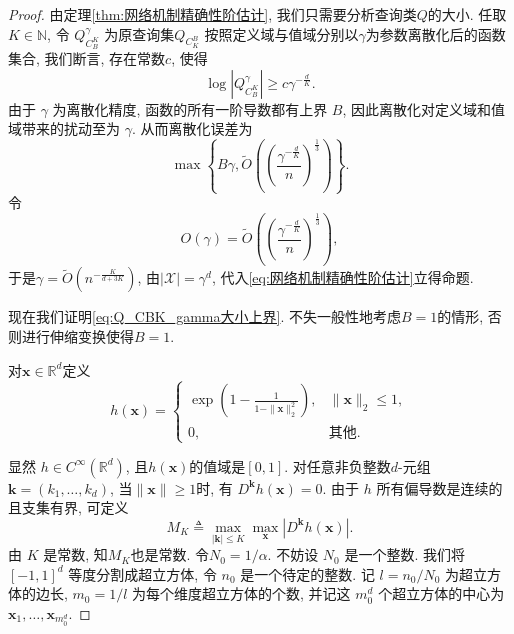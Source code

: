 \begin{proof}
  由定理\ref{thm:网络机制精确性阶估计}, 我们只需要分析查询类$Q$的大小. 任取 $K \in \mathbb{N}$, 令 $Q_{C_B^K}^{\gamma}$ 为原查询集$Q_{C_K^B}$ 按照定义域与值域分别以$\gamma$为参数离散化后的函数集合, 我们断言, 存在常数$c$, 使得
  \begin{equation}\label{eq:Q_CBK_gamma大小上界}
  \log \left|Q_{C_B^K}^{\gamma}\right| \ge c \gamma^{-\frac{d}{K}}.
  \end{equation}
  由于 $\gamma$ 为离散化精度, 函数的所有一阶导数都有上界 $B$, 因此离散化对定义域和值域带来的扰动至为 $\gamma$. 从而离散化误差为
  \[
  \max \left\{B\gamma, \tilde{O}\left(\left(\frac{\gamma^{-\frac{d}{K}}}{n}\right)^{\frac{1}{3}}\right)\right\}.
  \]
令
\[
  O(\gamma) = \tilde{O}\left(\left(\frac{\gamma^{-\frac{d}{K}}}{n}\right)^{\frac{1}{3}}\right),
\]
于是$\gamma = \tilde{O}\left(n^{-\frac{K}{d + 3K}}\right)$,
由$|\mathcal{X}| = \gamma^d$, 代入\eqref{eq:网络机制精确性阶估计}立得命题.

现在我们证明\eqref{eq:Q_CBK_gamma大小上界}. 不失一般性地考虑$B=1$的情形, 否则进行伸缩变换使得$B= 1$.

对$\mathbf{x} \in \mathbb{R}^d$定义
\[
h(\mathbf{x})= \begin{cases} \exp \left(1-\frac{1}{1-\|\mathbf{x}\|_2^2} \right),& \|\mathbf{x}\|_2 \leq 1, \\ 0,& \text{其他}. \end{cases}
\]

显然 $h\in C^{\infty}(\mathbb{R}^d)$, 且$h(\mathbf{x})$的值域是$[0,1]$. 对任意非负整数$d$-元组$\mathbf{k}=(k_1,\ldots,k_d)$, 当$\|\mathbf{x}\|\geq 1$时, 有 $D^{\mathbf{k}} h(\mathbf{x})=0$. 由于 $h$ 所有偏导数是连续的且支集有界, 可定义
\begin{equation*}
M_K \triangleq \max_{|\mathbf{k}|\leq K}\max_\mathbf{x} |D^{\mathbf{k}} h(\mathbf{x})|.
\end{equation*}
由 $K$ 是常数, 知$M_K$也是常数. 令$N_0=1/\alpha$. 不妨设 $N_0$ 是一个整数. 我们将 $[-1,1]^d$ 等度分割成超立方体, 令 $n_0$ 是一个待定的整数. 记 $l = n_0/N_0$ 为超立方体的边长, $m_0 = 1/l$ 为每个维度超立方体的个数, 并记这 $m_0^d$ 个超立方体的中心为 $\mathbf{x}_1,\ldots,\mathbf{x}_{m_0^d}$.


\end{proof}
